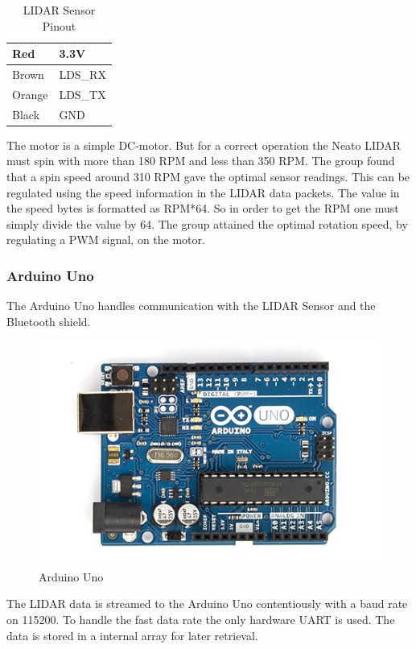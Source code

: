 \begin{table}[H]
\centering
\begin{tabular}{|l|l|}
\hline
Red & 3.3V \\ \hline
Brown & LDS\_RX \\ \hline
Orange & LDS\_TX \\ \hline
Black & GND \\ \hline
\end{tabular}
\caption{LIDAR Sensor Pinout}
\label{tab:lidars}
\end{table}
The motor is a simple DC-motor. But for a correct operation the Neato LIDAR must spin with more than 180 RPM and less than 350 RPM. The group found that a spin speed around 310 RPM gave the optimal sensor readings. This can be regulated using the speed information in the LIDAR data packets. The value in the speed bytes is formatted as RPM*64. So in order to get the RPM one must simply divide the value by 64. The group attained the optimal rotation speed, by regulating a PWM signal, on the motor. 

\subsubsection{Arduino Uno}
The Arduino Uno\cite{ArduinoUno} handles communication with the LIDAR Sensor and the Bluetooth shield.
\begin{figure}[H]
\centering
\includegraphics[scale=1]{billeder/ArduinoUno}
\caption{Arduino Uno}
\label{fig:ArduinoUno}
\end{figure}

The LIDAR data is streamed to the Arduino Uno contentiously with a baud rate on 115200. To handle the fast data rate the only hardware UART is used. The data is stored in a internal array for later retrieval.

